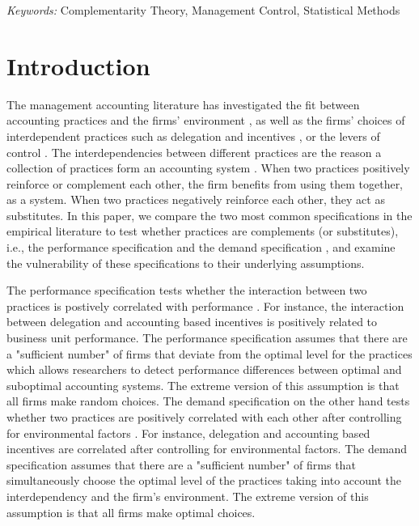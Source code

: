 \documentclass[12pt]{article}
\begin{document}
\noindent%
{\it Keywords:} Complementarity Theory, Management Control, Statistical Methods
\vfill

\newpage


\section{Introduction}\label{introduction}

The management accounting literature has investigated the fit between accounting practices and the firms' environment \citep{chenhall_management_2003, otley_contingency_2016}, as well as the firms' choices of interdependent practices such as delegation and incentives \citep{bouwens_assessing_2007, indjejikian_accounting_2012, moers_performance_2006}, or the levers of control \citep{simons_levers_1994, simons_performance_2000, widener_empirical_2007}. The interdependencies between different practices are the reason a collection of practices form an accounting system  \citep{grabner_management_2013,milgrom_complementarities_1995}. When two practices positively reinforce or complement each other, the firm benefits from using them together, as a system. When two practices negatively reinforce each other, they act as substitutes. In this paper, we compare the two most common specifications in the empirical literature to test whether practices are complements (or substitutes), i.e., the performance specification and the demand specification \citep{grabner_management_2013}, and examine the vulnerability of these specifications to their underlying assumptions. 

The performance specification tests whether the interaction between two practices is postively correlated with performance \citep{athey_empirical_1998, carree_note_2011, grabner_management_2013, hofmann_organizational_2017}. For instance, the interaction between delegation and accounting based incentives is positively related to business unit performance. The performance specification assumes that there are a "sufficient number" of firms that deviate from the optimal level for the practices which allows researchers to detect performance differences between optimal and suboptimal accounting systems. The extreme version of this assumption is that all firms make random choices. The demand specification on the other hand tests whether two practices are positively correlated with each other after controlling for environmental factors \citep{arora_testing_1996, grabner_management_2013, johansson_testing_2018, hofmann_organizational_2017}.  For instance, delegation and accounting based incentives are correlated after controlling for environmental factors. The demand specification assumes that there are a "sufficient number" of firms that simultaneously choose the optimal level of the practices taking into account the interdependency and the firm's environment. The extreme version of this assumption is that all firms make optimal choices.
\end{document}
